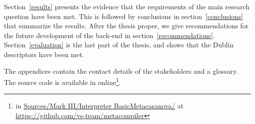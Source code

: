 Section~\ref{results} presents the evidence that the requirements of the main research question have been met.
This is followed by conclusions in section~\ref{conclusions} that summarize the results.
After the thesis proper, we give recommendations for the future development of the back-end in section~\ref{recommendations}.
Section~\ref{evaluation} is the last part of the thesis, and shows that the Dublin descriptors have been met.

The appendices contain the contact details of the stakeholders and a glossary.
The source code is available in online\footnote{in \url{Sources/Mark III/Interpreter BasicMetacasanova/} at \url{https://github.com/vs-team/metacompiler}}.
